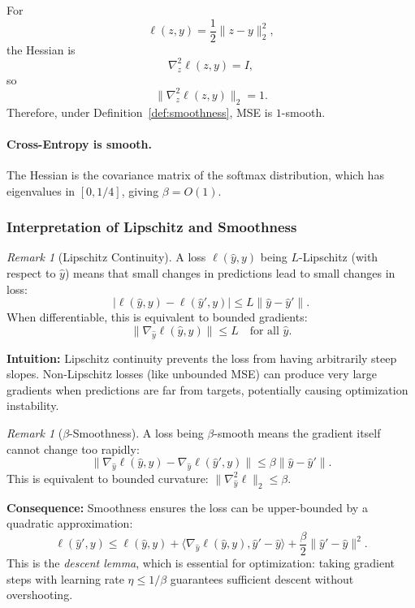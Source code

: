 \documentclass{article}
\theoremstyle{plain}
\theoremstyle{definition}
\theoremstyle{remark}
\newtheorem{remark}[theorem]{Remark}
\begin{document}
For
\[
\ell(z, y) = \frac{1}{2}\|z - y\|_2^2,
\]
the Hessian is
\[
\nabla_z^2 \ell(z,y) = I,
\]
so
\[
\|\nabla_z^2 \ell(z,y)\|_2 = 1.
\]
Therefore, under Definition~\ref{def:smoothness}, MSE is $1$-smooth.


\paragraph{Cross-Entropy is smooth.}

The Hessian is the covariance matrix of the softmax distribution, which has eigenvalues in $[0, 1/4]$, giving $\beta = O(1)$.

\subsubsection{Interpretation of Lipschitz and Smoothness}

\begin{remark}[Lipschitz Continuity]
A loss $\ell(\hat{y}, y)$ being $L$-Lipschitz (with respect to $\hat{y}$) means that small changes in predictions lead to small changes in loss:
\[
|\ell(\hat{y}, y) - \ell(\hat{y}', y)| \leq L\|\hat{y} - \hat{y}'\|.
\]
When differentiable, this is equivalent to bounded gradients:
\[
\|\nabla_{\hat{y}}\ell(\hat{y}, y)\| \leq L \quad \text{for all } \hat{y}.
\]

\textbf{Intuition:} Lipschitz continuity prevents the loss from having arbitrarily steep slopes. Non-Lipschitz losses (like unbounded MSE) can produce very large gradients when predictions are far from targets, potentially causing optimization instability.
\end{remark}


\begin{remark}[$\beta$-Smoothness]
A loss being $\beta$-smooth means the gradient itself cannot change too rapidly:
\[
\|\nabla_{\hat{y}}\ell(\hat{y}, y) - \nabla_{\hat{y}}\ell(\hat{y}', y)\| 
\leq \beta\|\hat{y} - \hat{y}'\|.
\]
This is equivalent to bounded curvature: $\|\nabla^2_{\hat{y}}\ell\|_2 \leq \beta$.

\textbf{Consequence:} Smoothness ensures the loss can be upper-bounded by a quadratic approximation:
\[
\ell(\hat{y}', y) \leq \ell(\hat{y}, y) 
+ \langle\nabla_{\hat{y}}\ell(\hat{y}, y), \hat{y}' - \hat{y}\rangle 
+ \frac{\beta}{2}\|\hat{y}' - \hat{y}\|^2.
\]
This is the \emph{descent lemma}, which is essential for optimization: taking gradient steps with learning rate $\eta \leq 1/\beta$ guarantees sufficient descent without overshooting.
\end{remark}
\end{document}
